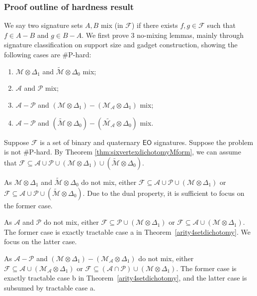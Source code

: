 \documentclass[a4paper,UKenglish,cleveref, autoref, thm-restate]{lipics-v2021}
\newcommand{\eo}[0]{\textsf{EO}}
\begin{document}
\subsubsection{Proof outline of hardness result}

We say two signature sets $A,B$ mix (in $\mathcal{F}$) if there exists $f,g\in \mathcal{F}$ such that $f\in A-B$ and $g\in B-A$.
We first prove 3 no-mixing lemmas, mainly through signature classification on support size and gadget construction, showing the following cases are \#P-hard:
\begin{enumerate}
    \item $\mathscr{M}\otimes\Delta_1$ and $\widetilde{\mathscr{M}}\otimes\Delta_0$ mix;
    \item $\mathscr{A}$ and $\mathscr{P}$ mix;
    \item $\mathscr{A}-\mathscr{P}$ and $(\mathscr{M}\otimes\Delta_1)-(\mathscr{M_A}\otimes\Delta_1)$ mix;
    \item $\mathscr{A}-\mathscr{P}$ and $(\widetilde{\mathscr{M}}\otimes\Delta_0)-(\widetilde{\mathscr{M_A}}\otimes\Delta_0)$ mix.
\end{enumerate}

Suppose $\mathcal{F}$ is a set of binary and quaternary $\eo$ signatures. Suppose the problem is not \#P-hard. By Theorem \ref{thm:sixvertexdichotomyMform}, we can assume that $\mathcal{F}\subseteq\mathscr{A}\cup\mathscr{P}\cup(\mathscr{M}\otimes\Delta_1)\cup(\widetilde{\mathscr{M}}\otimes\Delta_0)$.

 As $\mathscr{M}\otimes\Delta_1$ and $\widetilde{\mathscr{M}}\otimes\Delta_0$ do not mix, either $\mathcal{F} \subseteq \mathscr{A}\cup\mathscr{P}\cup(\mathscr{M}\otimes\Delta_1)$ or $\mathcal{F} \subseteq \mathscr{A}\cup\mathscr{P}\cup(\widetilde{\mathscr{M}}\otimes\Delta_0)$. Due to the dual property, it is sufficient to focus on the former case.

 As $\mathscr{A}$ and $\mathscr{P}$ do not mix, either $\mathcal{F} \subseteq \mathscr{P}\cup(\mathscr{M}\otimes\Delta_1)$ or $\mathcal{F} \subseteq \mathscr{A}\cup(\mathscr{M}\otimes\Delta_1)$. The former case is exactly tractable case a in Theorem~\ref{arity4setdichotomy}. We focus on the latter case.

 As $\mathscr{A}-\mathscr{P}$ and $(\mathscr{M}\otimes\Delta_1)-(\mathscr{M_A}\otimes\Delta_1)$ do not mix, either $\mathcal{F} \subseteq \mathscr{A}\cup(\mathscr{M_A}\otimes\Delta_1)$ or $\mathcal{F} \subseteq (\mathscr{A}\cap \mathscr{P})\cup(\mathscr{M}\otimes\Delta_1)$. The former case is exactly tractable case b in Theorem~\ref{arity4setdichotomy}, and the latter case is subsumed by  tractable case a.
\end{document}
